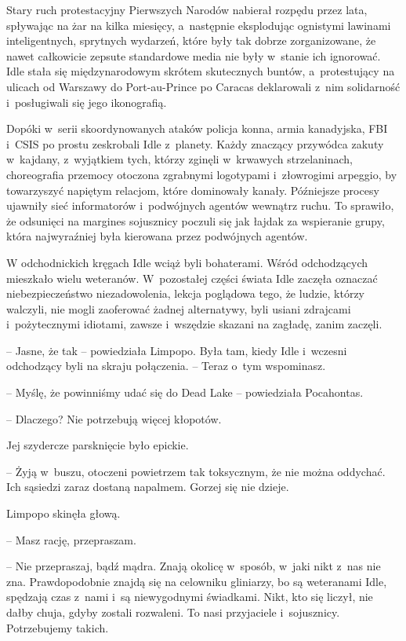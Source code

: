 \documentclass[oneside,polish,11pt,sfheadings]{mwbk}
\begin{document}
Stary ruch protestacyjny Pierwszych Narodów
nabierał rozpędu przez lata, spływając na żar na kilka miesięcy, a~następnie eksplodując ognistymi lawinami inteligentnych, sprytnych
wydarzeń, które były tak dobrze zorganizowane, że nawet całkowicie
zepsute standardowe media nie były w~stanie ich ignorować. Idle stała
się międzynarodowym skrótem skutecznych buntów, a~protestujący na
ulicach od Warszawy do Port-au-Prince po Caracas deklarowali z~nim
solidarność i~posługiwali się jego ikonografią.

Dopóki w~serii skoordynowanych ataków policja konna, armia kanadyjska,
FBI i~CSIS po prostu zeskrobali Idle z~planety. Każdy znaczący przywódca
zakuty w~kajdany, z~wyjątkiem tych, którzy zginęli w~krwawych
strzelaninach, choreografia przemocy otoczona zgrabnymi logotypami i~złowrogimi arpeggio, by towarzyszyć napiętym relacjom, które dominowały
kanały. Późniejsze procesy ujawniły sieć informatorów i~podwójnych
agentów wewnątrz ruchu. To sprawiło, że odsunięci na margines sojusznicy
poczuli się jak łajdak za wspieranie grupy, która najwyraźniej była
kierowana przez podwójnych agentów.

W odchodnickich kręgach Idle wciąż byli bohaterami. Wśród odchodzących
mieszkało wielu weteranów. W~pozostałej części świata Idle zaczęła
oznaczać niebezpieczeństwo niezadowolenia, lekcja poglądowa tego, że
ludzie, którzy walczyli, nie mogli zaoferować żadnej alternatywy, byli
usiani zdrajcami i~pożytecznymi idiotami, zawsze i~wszędzie skazani na
zagładę, zanim zaczęli.

-- Jasne, że tak -- powiedziała Limpopo. Była tam, kiedy Idle i~wczesni
odchodzący byli na skraju połączenia. -- Teraz o~tym wspominasz.

-- Myślę, że powinniśmy udać się do Dead Lake -- powiedziała Pocahontas.

-- Dlaczego? Nie potrzebują więcej kłopotów.

Jej szydercze parsknięcie było epickie. 

-- Żyją w~buszu, otoczeni
powietrzem tak toksycznym, że nie można oddychać. Ich sąsiedzi zaraz
dostaną napalmem. Gorzej się nie dzieje.

Limpopo skinęła głową. 

-- Masz rację, przepraszam.

-- Nie przepraszaj, bądź mądra. Znają okolicę w~sposób, w~jaki nikt z~nas
nie zna. Prawdopodobnie znajdą się na celowniku gliniarzy, bo są
weteranami Idle, spędzają czas z~nami i~są niewygodnymi świadkami. Nikt,
kto się liczył, nie dałby chuja, gdyby zostali rozwaleni. To nasi
przyjaciele i~sojusznicy. Potrzebujemy takich.
\end{document}
